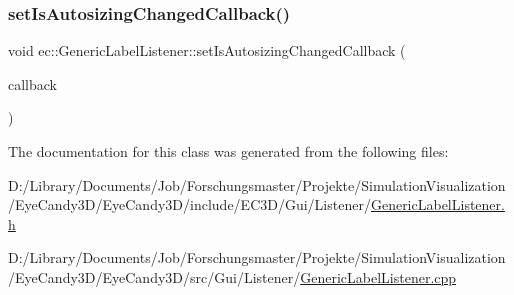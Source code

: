 \mbox{\label{classec_1_1_generic_label_listener_a3141f73b5396a6a57b81159619ada6db}} 
\subsubsection{\texorpdfstring{set\+Is\+Autosizing\+Changed\+Callback()}{setIsAutosizingChangedCallback()}}
{\footnotesize\ttfamily void ec\+::\+Generic\+Label\+Listener\+::set\+Is\+Autosizing\+Changed\+Callback (\begin{DoxyParamCaption}\item[{const \mbox{\hyperlink{classec_1_1_generic_label_listener_adf4cec1bd13682ce66c52f0484fe46c6}{Is\+Autosizing\+Changed\+\_\+\+Callback}} \&}]{callback }\end{DoxyParamCaption})}



The documentation for this class was generated from the following files\+:\begin{DoxyCompactItemize}
\item 
D\+:/\+Library/\+Documents/\+Job/\+Forschungsmaster/\+Projekte/\+Simulation\+Visualization/\+Eye\+Candy3\+D/\+Eye\+Candy3\+D/include/\+E\+C3\+D/\+Gui/\+Listener/\mbox{\hyperlink{_generic_label_listener_8h}{Generic\+Label\+Listener.\+h}}\item 
D\+:/\+Library/\+Documents/\+Job/\+Forschungsmaster/\+Projekte/\+Simulation\+Visualization/\+Eye\+Candy3\+D/\+Eye\+Candy3\+D/src/\+Gui/\+Listener/\mbox{\hyperlink{_generic_label_listener_8cpp}{Generic\+Label\+Listener.\+cpp}}\end{DoxyCompactItemize}
